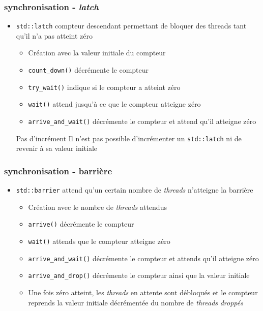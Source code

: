 \documentclass[C++.tex]{subfiles}
\begin{document}
\begin{frame}[fragile]
	\frametitle{synchronisation - \textit{latch}}


	\begin{itemize}
		\item \lstinline|std::latch| compteur descendant permettant de bloquer des threads tant qu'il n'a pas atteint zéro
		\begin{itemize}
			\item Création avec la valeur initiale du compteur
			\item \lstinline|count_down()| décrémente le compteur
			\item \lstinline|try_wait()| indique si le compteur a atteint zéro
			\item \lstinline|wait()| attend jusqu'à ce que le compteur atteigne zéro
			\item \lstinline|arrive_and_wait()| décrémente le compteur et attend qu'il atteigne zéro
		\end{itemize}

		\begin{alertblock}{Pas d'incrément}
			Il n'est pas possible d'incrémenter un \lstinline|std::latch| ni de revenir à sa valeur initiale
		\end{alertblock}
	\end{itemize}
\end{frame}

\begin{frame}[fragile]
	\frametitle{synchronisation - barrière}
	\begin{itemize}
		\item \lstinline|std::barrier| attend qu'un certain nombre de \textit{threads} n'atteigne la barrière
		\begin{itemize}
			\item Création avec le nombre de \textit{threads} attendus
			\item \lstinline|arrive()| décrémente le compteur
			\item \lstinline|wait()| attends que le compteur atteigne zéro
			\item \lstinline|arrive_and_wait()| décrémente le compteur et attends qu'il atteigne zéro
			\item \lstinline|arrive_and_drop()| décrémente le compteur ainsi que la valeur initiale
			\item Une fois zéro atteint, les \textit{threads} en attente sont débloqués et le compteur reprends la valeur initiale décrémentée du nombre de \textit{threads} \og \textit{droppés}\fg{}
		\end{itemize}
	\end{itemize}
\end{frame}
\end{document}
